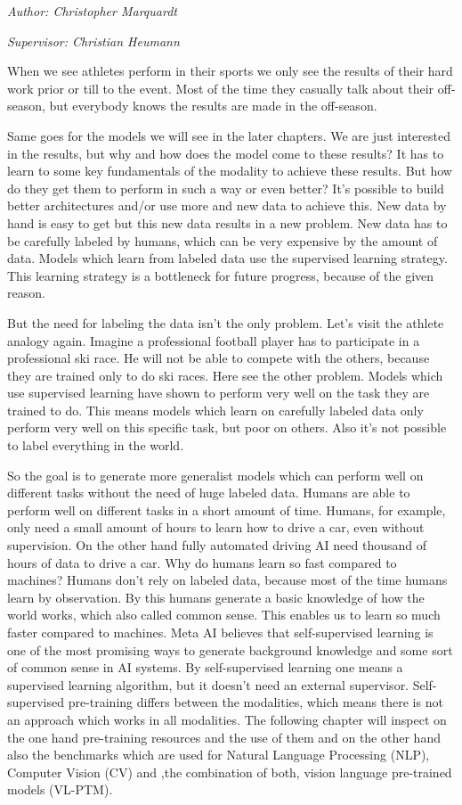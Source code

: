 \documentclass[
]{krantz}
\begin{document}
\emph{Author: Christopher Marquardt}

\emph{Supervisor: Christian Heumann}

When we see athletes perform in their sports we only see the results of their hard work prior or till to the event. Most of the time they casually talk about their off-season, but everybody knows the results are made in the off-season.

Same goes for the models we will see in the later chapters. We are just interested in the results, but why and how does the model come to these results? It has to learn to some key fundamentals of the modality to achieve these results. But how do they get them to perform in such a way or even better? It's possible to build better architectures and/or use more and new data to achieve this. New data by hand is easy to get but this new data results in a new problem. New data has to be carefully labeled by humans, which can be very expensive by the amount of data. Models which learn from labeled data use the supervised learning strategy. This learning strategy is a bottleneck for future progress, because of the given reason.

But the need for labeling the data isn't the only problem. Let's visit the athlete analogy again. Imagine a professional football player has to participate in a professional ski race. He will not be able to compete with the others, because they are trained only to do ski races. Here see the other problem. Models which use supervised learning have shown to perform very well on the task they are trained to do. This means models which learn on carefully labeled data only perform very well on this specific task, but poor on others. Also it's not possible to label everything in the world.

So the goal is to generate more generalist models which can perform well on different tasks without the need of huge labeled data. Humans are able to perform well on different tasks in a short amount of time. Humans, for example, only need a small amount of hours to learn how to drive a car, even without supervision. On the other hand fully automated driving AI need thousand of hours of data to drive a car. Why do humans learn so fast compared to machines?
Humans don't rely on labeled data, because most of the time humans learn by observation. By this humans generate a basic knowledge of how the world works, which also called common sense. This enables us to learn so much faster compared to machines.
Meta AI \citep{darkMatter} believes that self-supervised learning is one of the most promising ways to generate background knowledge and some sort of common sense in AI systems. By self-supervised learning one means a supervised learning algorithm, but it doesn't need an external supervisor. Self-supervised pre-training differs between the modalities, which means there is not an approach which works in all modalities.
The following chapter will inspect on the one hand pre-training resources and the use of them and on the other hand also the benchmarks which are used for Natural Language Processing (NLP), Computer Vision (CV) and ,the combination of both, vision language pre-trained models (VL-PTM).
\end{document}

